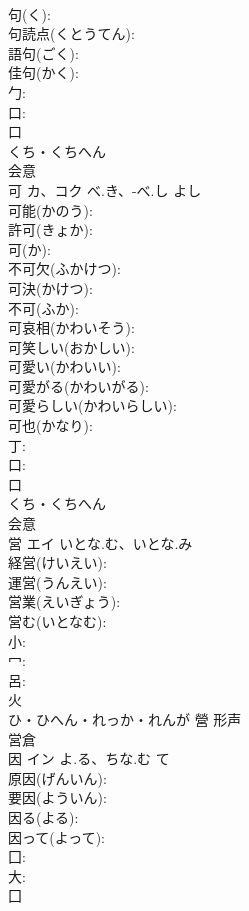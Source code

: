 \documentclass[8pt]{extreport}
\begin{document}
\begin{CJK}{UTF8}{min}
\\	句(く): 
\\	句読点(くとうてん): 
\\	語句(ごく): 
\\	佳句(かく): 
\\	勹: 
\\	口: 
\\	口	
\\	くち・くちへん	
\\	会意 
\\	可	カ、コク	べ.き、-べ.し	よし	
\\	可能(かのう): 
\\	許可(きょか): 
\\	可(か): 
\\	不可欠(ふかけつ): 
\\	可決(かけつ): 
\\	不可(ふか): 
\\	可哀相(かわいそう): 
\\	可笑しい(おかしい): 
\\	可愛い(かわいい): 
\\	可愛がる(かわいがる): 
\\	可愛らしい(かわいらしい): 
\\	可也(かなり): 
\\	丁: 
\\	口: 
\\	口	
\\	くち・くちへん	
\\	会意 
\\	営	エイ	いとな.む、いとな.み		
\\	経営(けいえい): 
\\	運営(うんえい): 
\\	営業(えいぎょう): 
\\	営む(いとなむ): 
\\	小: 
\\	冖: 
\\	呂: 
\\	火	
\\	ひ・ひへん・れっか・れんが	營	形声 
\\	営倉 
\\	因	イン	よ.る、ちな.む	て	
\\	原因(げんいん): 
\\	要因(よういん): 
\\	因る(よる): 
\\	因って(よって): 
\\	囗: 
\\	大: 
\\	囗	

\end{CJK}
\end{document}
